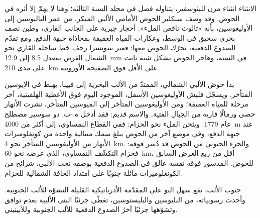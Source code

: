 الانثناء انثناء مرن لليثوسفير، يتناوله فصل في مجلد السنة
الثالثة؛ وهنا لا يهمّ إلا أثره في الحوض. وقد وصف سنكلير الحوض الأمامي الألبي المبكر، من عمر الباليوسين إلى الأوليغوسين،
بأنه «ثالوث ناقص الملء»: أحجار جيرية على الجانب القاري، وطين نصف بحري سحيق في
الوسط، وعكارات المياه العميقة بمحاذاة جبهة الدفع. ومع تقدّم الصدوع الدفعية، تحرّك الحوض
معها: فعبر سويسرا زحف خط ساحله القاري نحو الشمال الغربي بمعدل 8.5
إلى \qty{12.9}{mm} في السنة، وهاجر الحوض بشكل شبه ثابت على مدى
\qty{210}{km} على الأقل فوق الصفيحة الأوروبية.

بدأ حوض  الألبي الشمالي، الممتدّ من الألب البحرية إلى فيينا،
يهبط في الإيوسين المتأخر. ويسجّل فليش الأوليغوسين الأسفل، الموجود اليوم فوق الأغطية
الهلفيتية، آخر مرحلة للمياه العميقة؛ ومن الأوليغوسين المتأخر إلى الميوسين المتأخر، نشرت الأنهار
حصى ورمالًا قارية من الجبال الفتية. والاسم قديم: فقد أدخل ه.-ب. دو سوسير
مصطلح \emph{} عام 1779. ويثخن الملء نحو الحزام: ففي
القطاع النمساوي، إلى أكثر من \qty{4000}{m} عند جبهة الدفع، وفي موضع آخر من الحوض
يبلغ سمك متتالية واحدة من كونغلوميرات الأنهار من الأوليغوسين المتأخر نحو \qty{4}{km}. والجزء الجنوبي من
الحوض قد دُسر فوقه: فحزام التكشّف النمساوي، الذي عرضه نحو \qty{60}{km}، أقل
من ربع العرض السابق للحوض.  المدسور فوقه نفسه عالق في
الصدوع الدفعية بوصفه  تحت الألبي، شرائح من الكونغلوميرات مائلة جنوبًا على امتداد
الحافة الشمالية للحزام.

جنوب الألب، يقع سهل البو على المقدّمة الأدرياتيكية القليلة التشوّه للألب
الجنوبية. وأحدث رسوبياته، من البليوسين والبليستوسين، تغطّي جزئيًا البنى
الألبية بعدم توافق وتشوّهها جزئيًا آخرُ الصدوع الدفعية للألب الجنوبية
وللأبينيني.

